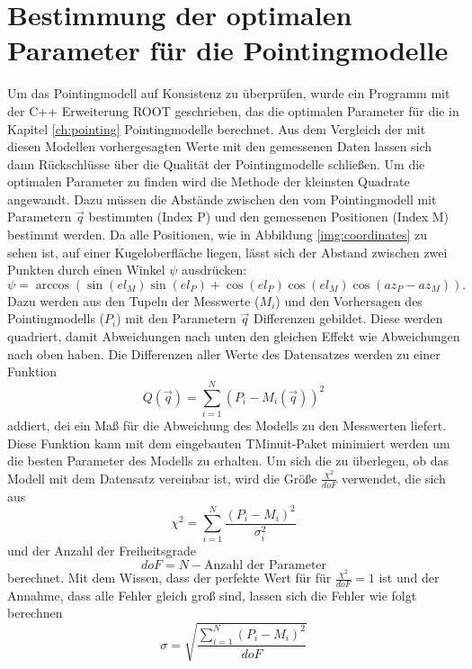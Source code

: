 \section{Bestimmung der optimalen Parameter für die Pointingmodelle}
Um das Pointingmodell auf Konsistenz zu überprüfen, wurde ein Programm mit der C++ Erweiterung ROOT geschrieben, das die optimalen Parameter für die in Kapitel \ref{ch:pointing} Pointingmodelle berechnet. Aus dem Vergleich der mit diesen Modellen vorhergesagten Werte mit den gemessenen Daten lassen sich dann Rückschlüsse über die Qualität der Pointingmodelle schließen. Um die optimalen Parameter zu finden wird die Methode der kleinsten Quadrate angewandt. 
Dazu müssen die Abstände zwischen den vom Pointingmodell mit Parametern $\vec{q}$ bestimmten (Index P) und den gemessenen Positionen (Index M) bestimmt werden. Da alle Positionen, wie in Abbildung \ref{img:coordinates} zu sehen ist, auf einer Kugeloberfläche liegen, lässt sich der Abstand zwischen zwei Punkten durch einen Winkel $\psi$ ausdrücken:
\begin{equation}
\psi=\arccos\left(\sin(el_M)\sin(el_P)+\cos(el_P)\cos(el_M)\cos(az_P-az_M)\right).
\end{equation}
Dazu werden  aus den Tupeln der Messwerte ($M_i$) und den Vorhersagen des Pointingmodells ($P_i$) mit den Parametern $\vec{q}$ Differenzen gebildet. Diese werden quadriert, damit Abweichungen nach unten den gleichen Effekt wie Abweichungen nach oben haben. Die Differenzen aller Werte des Datensatzes werden zu einer Funktion
\begin{equation}
Q(\vec{q})=\sum^N_{i=1}\left(P_i-M_i(\vec{q})\right)^2
\end{equation}
addiert, dei ein Maß für die Abweichung des Modells zu den Messwerten liefert. Diese Funktion kann mit dem eingebauten TMinuit-Paket minimiert werden um die besten Parameter des Modells zu erhalten. Um sich die zu überlegen, ob das Modell mit dem Datensatz vereinbar ist, wird die Größe $\frac{\chi^2}{doF}$ verwendet, die sich aus 
\begin{equation}
\chi^2=\sum^N_{i=1}\frac{\left(P_i-M_i\right)^2}{\sigma_i^2}
\end{equation}
und der Anzahl der Freiheitsgrade
\begin{equation}
doF=N-\textrm{Anzahl der Parameter}
\end{equation}
berechnet. Mit dem Wissen, dass der perfekte Wert für für $\frac{\chi^2}{doF}=1$ ist und der Annahme, dass alle Fehler gleich groß sind, lassen sich die Fehler wie folgt berechnen
\begin{equation}
\sigma=\sqrt{\frac{\sum^N_{i=1}\left(P_i-M_i\right)^2}{doF}}
\end{equation}

